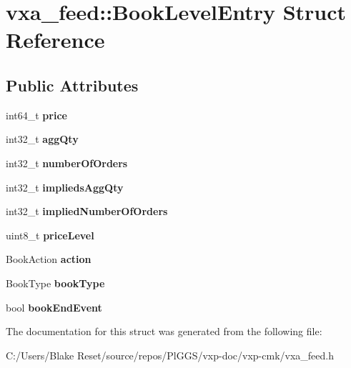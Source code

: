 \hypertarget{structvxa__feed_1_1_book_level_entry}{}\section{vxa\+\_\+feed\+::Book\+Level\+Entry Struct Reference}
\label{structvxa__feed_1_1_book_level_entry}
\subsection*{Public Attributes}
\begin{DoxyCompactItemize}
\item 
\mbox{\label{structvxa__feed_1_1_book_level_entry_ae5d74f13f77d4aa1888e837b0810de79}} 
int64\+\_\+t {\bfseries price}
\item 
\mbox{\label{structvxa__feed_1_1_book_level_entry_a07c56e1fa609aaba62c0eef8487114ce}} 
int32\+\_\+t {\bfseries agg\+Qty}
\item 
\mbox{\label{structvxa__feed_1_1_book_level_entry_a780bca461d2d794cdc2cd5fa504e4851}} 
int32\+\_\+t {\bfseries number\+Of\+Orders}
\item 
\mbox{\label{structvxa__feed_1_1_book_level_entry_a8f43db64be7c45af03f63b7fb3d2e7af}} 
int32\+\_\+t {\bfseries implieds\+Agg\+Qty}
\item 
\mbox{\label{structvxa__feed_1_1_book_level_entry_a1e8b2bd9e7763408edc2cdf40c2b7ff1}} 
int32\+\_\+t {\bfseries implied\+Number\+Of\+Orders}
\item 
\mbox{\label{structvxa__feed_1_1_book_level_entry_a20752748f0ace4778e754a0cd89f3c9b}} 
uint8\+\_\+t {\bfseries price\+Level}
\item 
\mbox{\label{structvxa__feed_1_1_book_level_entry_a60a27f9e642abd423ce9b363aab49131}} 
Book\+Action {\bfseries action}
\item 
\mbox{\label{structvxa__feed_1_1_book_level_entry_afed02c347d0271373010530983c44335}} 
Book\+Type {\bfseries book\+Type}
\item 
\mbox{\label{structvxa__feed_1_1_book_level_entry_ad1f309a36cd0964658df04e7f53ffc8c}} 
bool {\bfseries book\+End\+Event}
\end{DoxyCompactItemize}


The documentation for this struct was generated from the following file\+:\begin{DoxyCompactItemize}
\item 
C\+:/\+Users/\+Blake Reset/source/repos/\+Pl\+G\+G\+S/vxp-\/doc/vxp-\/cmk/vxa\+\_\+feed.\+h\end{DoxyCompactItemize}
